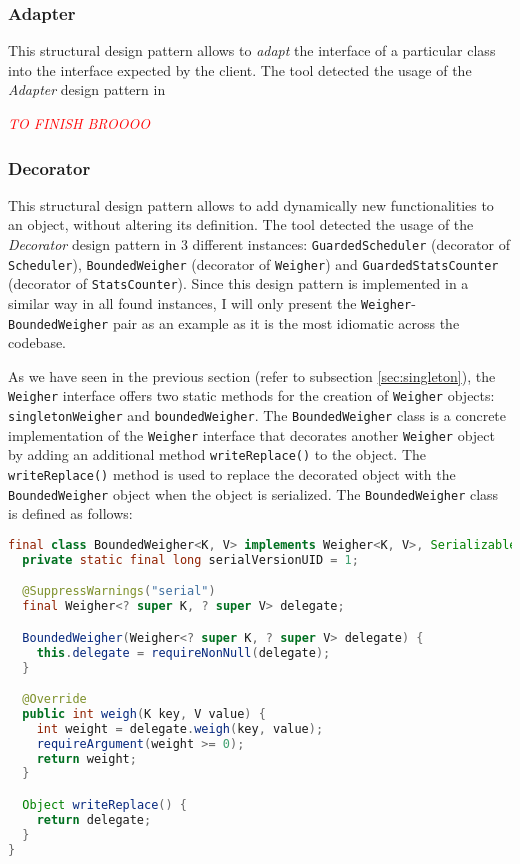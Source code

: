 \subsubsection{Adapter}

This structural design pattern allows to \textit{adapt} the interface of a particular class into the interface expected by the client. The tool detected the usage of the \textit{Adapter} design pattern in 

\textcolor{red}{\textit{TO FINISH BROOOO}}

\subsubsection{Decorator}

This structural design pattern allows to add dynamically new functionalities to an object, without altering its definition. The tool detected the usage of the \textit{Decorator} design pattern in 3 different instances: \texttt{GuardedScheduler} (decorator of \texttt{Scheduler}), \texttt{BoundedWeigher} (decorator of \texttt{Weigher}) and \texttt{GuardedStatsCounter} (decorator of \texttt{StatsCounter}). Since this design pattern is implemented in a similar way in all found instances, I will only present the \texttt{Weigher}-\texttt{BoundedWeigher} pair as an example as it is the most idiomatic across the codebase.

As we have seen in the previous section (refer to subsection \ref{sec:singleton}), the \texttt{Weigher} interface offers two static methods for the creation of \texttt{Weigher} objects: \texttt{singletonWeigher} and \texttt{boundedWeigher}. The \texttt{BoundedWeigher} class is a concrete implementation of the \texttt{Weigher} interface that decorates another \texttt{Weigher} object by adding an additional method \texttt{writeReplace()} to the object. The \texttt{writeReplace()} method is used to replace the decorated object with the \texttt{BoundedWeigher} object when the object is serialized. The \texttt{BoundedWeigher} class is defined as follows:

\begin{lstlisting}[language=Java]
final class BoundedWeigher<K, V> implements Weigher<K, V>, Serializable {
  private static final long serialVersionUID = 1;

  @SuppressWarnings("serial")
  final Weigher<? super K, ? super V> delegate;

  BoundedWeigher(Weigher<? super K, ? super V> delegate) {
    this.delegate = requireNonNull(delegate);
  }

  @Override
  public int weigh(K key, V value) {
    int weight = delegate.weigh(key, value);
    requireArgument(weight >= 0);
    return weight;
  }

  Object writeReplace() {
    return delegate;
  }
}
\end{lstlisting}

